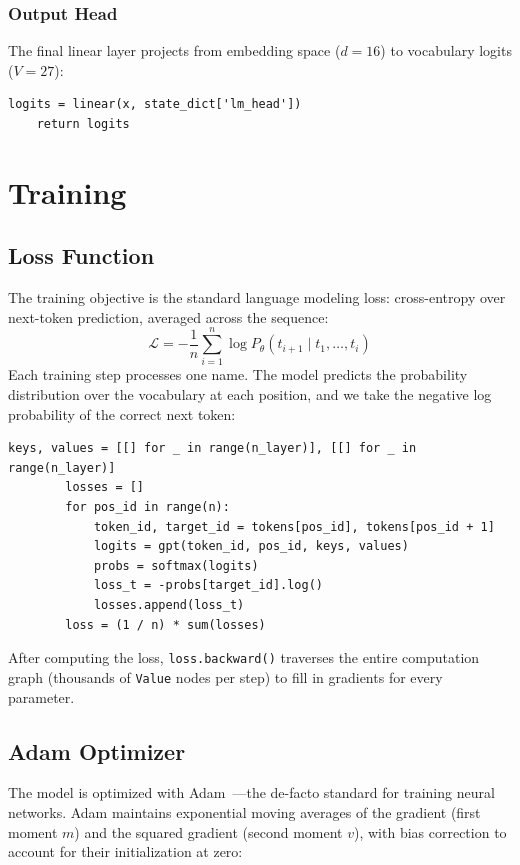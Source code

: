 \documentclass[11pt,a4paper]{article}
\begin{document}
\subsubsection{Output Head}

The final linear layer projects from embedding space ($d=16$) to vocabulary logits ($V=27$):
\begin{lstlisting}[firstnumber=199]
    logits = linear(x, state_dict['lm_head'])
    return logits
\end{lstlisting}

\section{Training}

\subsection{Loss Function}

The training objective is the standard language modeling loss: cross-entropy over next-token prediction, averaged across the sequence:
\[
\mathcal{L} = -\frac{1}{n} \sum_{i=1}^{n} \log P_\theta(t_{i+1} \mid t_1, \ldots, t_i)
\]
Each training step processes one name. The model predicts the probability distribution over the vocabulary at each position, and we take the negative log probability of the correct next token:

\begin{lstlisting}[firstnumber=218]
        keys, values = [[] for _ in range(n_layer)], [[] for _ in range(n_layer)]
        losses = []
        for pos_id in range(n):
            token_id, target_id = tokens[pos_id], tokens[pos_id + 1]
            logits = gpt(token_id, pos_id, keys, values)
            probs = softmax(logits)
            loss_t = -probs[target_id].log()
            losses.append(loss_t)
        loss = (1 / n) * sum(losses)
\end{lstlisting}

After computing the loss, \texttt{loss.backward()} traverses the entire computation graph (thousands of \texttt{Value} nodes per step) to fill in gradients for every parameter.

\subsection{Adam Optimizer}

The model is optimized with Adam~\cite{kingma2015adam}---the de-facto standard for training neural networks. Adam maintains exponential moving averages of the gradient (first moment $m$) and the squared gradient (second moment $v$), with bias correction to account for their initialization at zero:
\end{document}
